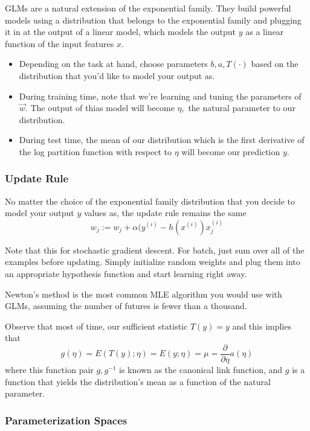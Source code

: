\documentclass[12pt]{scrartcl}
\begin{document}
GLMs are a natural extension of the exponential family. They build powerful models using a distribution that belongs to the exponential family and plugging it in at the output of a linear model, which models the output $y$ as a linear function of the input features $x$.
\begin{itemize}
    \item Depending on the task at hand, choose parameters $b, a, T(\cdot)$ based on the distribution that you'd like to model your output as.
    \item During training time, note that we're learning and tuning the parameters of $\vec{w}$. The output of thias model will become $\eta, $ the natural parameter to our distribution.
    \item During test time, the mean of our distribution which is the first derivative of the log partition function with respect to $\eta$ will become our prediction $y$.
\end{itemize}

\subsubsection{Update Rule}

No matter the choice of the exponential family distribution that you decide to model your output $y$ values as, the update rule remains the same
\[w_j := w_j + \alpha (y^{(i)} - h(x^{(i)})x_j^{(i)}\]

Note that this for stochastic gradient descent. For batch, just sum over all of the examples before updating.
Simply initialize random weights and plug them into an appropriate hypothesis function and start learning right away.

\begin{note}
    Newton's method is the most common MLE algorithm you would use with GLMs, assuming the number of futures is fewer than a thousand.
\end{note}

Observe that most of time, our sufficient statistic $T(y) = y$ and this implies that 
\[g(\eta) = E(T(y); \eta) = E(y; \eta) = \mu = \frac{\partial}{\partial \eta}a(\eta)\]
where this function pair $g, g^{-1}$ is known as the canonical link function, and $g$ is a function that yields the distribution's mean as a function of the natural parameter.

\subsubsection{Parameterization Spaces}
\end{document}
